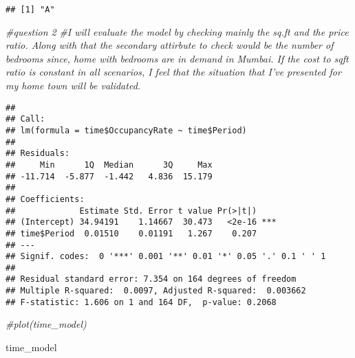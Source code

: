 \documentclass[]{article}
\newenvironment{Shaded}{\begin{snugshade}}{\end{snugshade}}
\newcommand{\KeywordTok}[1]{\textcolor[rgb]{0.13,0.29,0.53}{\textbf{#1}}}
\newcommand{\DataTypeTok}[1]{\textcolor[rgb]{0.13,0.29,0.53}{#1}}
\newcommand{\StringTok}[1]{\textcolor[rgb]{0.31,0.60,0.02}{#1}}
\newcommand{\CommentTok}[1]{\textcolor[rgb]{0.56,0.35,0.01}{\textit{#1}}}
\newcommand{\OtherTok}[1]{\textcolor[rgb]{0.56,0.35,0.01}{#1}}
\newcommand{\OperatorTok}[1]{\textcolor[rgb]{0.81,0.36,0.00}{\textbf{#1}}}
\newcommand{\NormalTok}[1]{#1}
\begin{document}
\begin{verbatim}
## [1] "A"
\end{verbatim}

\begin{Shaded}
\begin{Highlighting}[]
\CommentTok{#question 2}
\CommentTok{#I will evaluate the model by checking mainly the sq.ft and the price ratio. Along with that the secondary attirbute to check would be the number of bedrooms since, home with bedrooms are in demand in Mumbai. If the cost to sqft ratio is constant in all scenarios, I feel that the situation that I've presented for my home town will be validated.}
\end{Highlighting}
\end{Shaded}

\begin{Shaded}
\end{Shaded}

\begin{verbatim}
## 
## Call:
## lm(formula = time$OccupancyRate ~ time$Period)
## 
## Residuals:
##     Min      1Q  Median      3Q     Max 
## -11.714  -5.877  -1.442   4.836  15.179 
## 
## Coefficients:
##             Estimate Std. Error t value Pr(>|t|)    
## (Intercept) 34.94191    1.14667  30.473   <2e-16 ***
## time$Period  0.01510    0.01191   1.267    0.207    
## ---
## Signif. codes:  0 '***' 0.001 '**' 0.01 '*' 0.05 '.' 0.1 ' ' 1
## 
## Residual standard error: 7.354 on 164 degrees of freedom
## Multiple R-squared:  0.0097, Adjusted R-squared:  0.003662 
## F-statistic: 1.606 on 1 and 164 DF,  p-value: 0.2068
\end{verbatim}

\begin{Shaded}
\begin{Highlighting}[]
\CommentTok{#plot(time_model)}

\NormalTok{time_model}
\end{Highlighting}
\end{Shaded}
\end{document}
